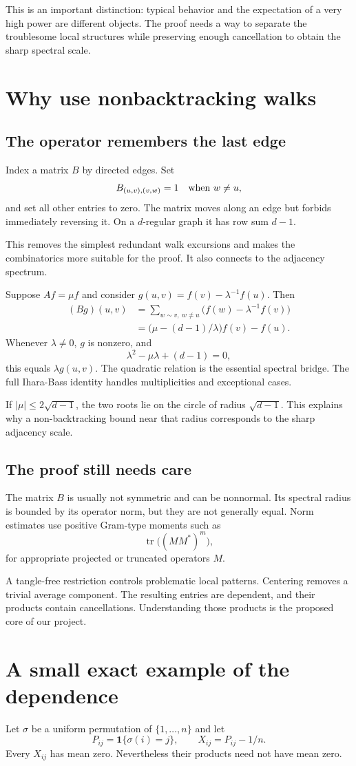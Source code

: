\documentclass[11pt,letterpaper]{article}
\newcommand{\Page}[1]{\clearpage\section*{#1}}
\newcommand{\Sub}[1]{\subsection*{#1}}
\begin{document}
This is an important distinction: typical behavior and the expectation of a very high power are different objects. The proof needs a way to separate the troublesome local structures while preserving enough cancellation to obtain the sharp spectral scale.


\Page{Why use nonbacktracking walks}

\Sub{The operator remembers the last edge}
Index a matrix $B$ by directed edges. Set
\[
 B_{(u,v),(v,w)}=1\quad\hbox{when }w\ne u,
\]
and set all other entries to zero. The matrix moves along an edge but forbids immediately reversing it. On a $d$-regular graph it has row sum $d-1$.

This removes the simplest redundant walk excursions and makes the combinatorics more suitable for the proof. It also connects to the adjacency spectrum.

Suppose $Af=\mu f$ and consider $g(u,v)=f(v)-\lambda^{-1}f(u)$. Then
\begin{align*}
 (Bg)(u,v)&=\sum_{w\sim v,\ w\ne u}
                  \big(f(w)-\lambda^{-1}f(v)\big)\\
 &=\big(\mu-(d-1)/\lambda\big)f(v)-f(u).
\end{align*}
Whenever $\lambda\ne0$, $g$ is nonzero, and
\[
 \lambda^2-\mu\lambda+(d-1)=0,
\]
this equals $\lambda g(u,v)$. The quadratic relation is the essential spectral bridge. The full Ihara-Bass identity handles multiplicities and exceptional cases.

If $|\mu|\leq2\sqrt{d-1}$, the two roots lie on the circle of radius $\sqrt{d-1}$. This explains why a non-backtracking bound near that radius corresponds to the sharp adjacency scale.

\Sub{The proof still needs care}
The matrix $B$ is usually not symmetric and can be nonnormal. Its spectral radius is bounded by its operator norm, but they are not generally equal. Norm estimates use positive Gram-type moments such as
\[
 \operatorname{tr}\big((MM^*)^m\big),
\]
for appropriate projected or truncated operators $M$.

A tangle-free restriction controls problematic local patterns. Centering removes a trivial average component. The resulting entries are dependent, and their products contain cancellations. Understanding those products is the proposed core of our project.


\Page{A small exact example of the dependence}

Let $\sigma$ be a uniform permutation of $\{1,\ldots,n\}$ and let
\[
 P_{ij}=\mathbf1\{\sigma(i)=j\},\qquad
 X_{ij}=P_{ij}-1/n.
\]
Every $X_{ij}$ has mean zero. Nevertheless their products need not have mean zero.
\end{document}
